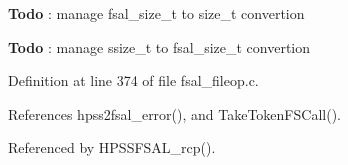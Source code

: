 \begin{Desc}
\item[{\bf Todo}]: manage fsal\_\-size\_\-t to size\_\-t convertion \end{Desc}


\begin{Desc}
\item[{\bf Todo}]: manage ssize\_\-t to fsal\_\-size\_\-t convertion \end{Desc}


Definition at line 374 of file fsal\_\-fileop.c.

References hpss2fsal\_\-error(), and TakeTokenFSCall().

Referenced by HPSSFSAL\_\-rcp().